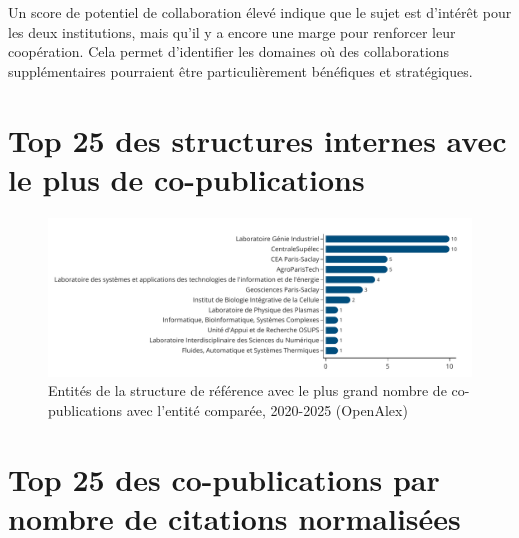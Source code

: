 \documentclass[french, 11pt]{dibiso/pubpart}
\begin{document}
Un score de potentiel de collaboration élevé indique que le sujet est d'intérêt pour les deux institutions, mais qu'il y a encore une marge pour renforcer leur coopération. Cela permet d'identifier les domaines où des collaborations supplémentaires pourraient être particulièrement bénéfiques et stratégiques.

\bigskip









\pagebreak

\section{Top 25 des structures internes avec le plus de co-publications}

\begin{figure}[!h]
  \includegraphics[width=\textwidth]{figures/institutions_lineage_collaborations.pdf}
  \centering
  \caption{Entités de la structure de référence avec le plus grand nombre de co-publications avec l'entité comparée, 2020-2025 (OpenAlex)}
  \label{fig_institutions_lineage_collaborations}
\end{figure}

{\footnotesize\institutionslineagecollaborationsinfo}







\pagebreak

\section{Top 25 des co-publications par nombre de citations normalisées}
\end{document}

